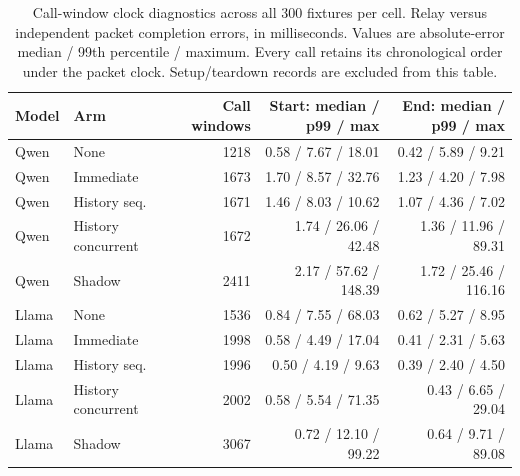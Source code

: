 \begin{table}[t]\centering\small
\caption{Call-window clock diagnostics across all 300 fixtures per cell. Relay versus independent packet completion errors, in milliseconds. Values are absolute-error median / 99th percentile / maximum. Every call retains its chronological order under the packet clock. Setup/teardown records are excluded from this table.}
\label{tab:live-clock}
\begin{tabularx}{\textwidth}{@{}lYrrr@{}}\toprule
Model & Arm & Call windows & Start: median / p99 / max & End: median / p99 / max\\\midrule
Qwen & None & 1218 & 0.58 / 7.67 / 18.01 & 0.42 / 5.89 / 9.21 \\
Qwen & Immediate & 1673 & 1.70 / 8.57 / 32.76 & 1.23 / 4.20 / 7.98 \\
Qwen & History seq. & 1671 & 1.46 / 8.03 / 10.62 & 1.07 / 4.36 / 7.02 \\
Qwen & History concurrent & 1672 & 1.74 / 26.06 / 42.48 & 1.36 / 11.96 / 89.31 \\
Qwen & Shadow & 2411 & 2.17 / 57.62 / 148.39 & 1.72 / 25.46 / 116.16 \\
Llama & None & 1536 & 0.84 / 7.55 / 68.03 & 0.62 / 5.27 / 8.95 \\
Llama & Immediate & 1998 & 0.58 / 4.49 / 17.04 & 0.41 / 2.31 / 5.63 \\
Llama & History seq. & 1996 & 0.50 / 4.19 / 9.63 & 0.39 / 2.40 / 4.50 \\
Llama & History concurrent & 2002 & 0.58 / 5.54 / 71.35 & 0.43 / 6.65 / 29.04 \\
Llama & Shadow & 3067 & 0.72 / 12.10 / 99.22 & 0.64 / 9.71 / 89.08 \\
\bottomrule\end{tabularx}
\end{table}
